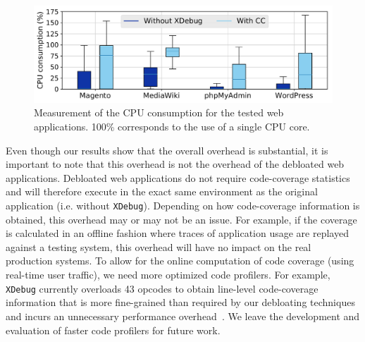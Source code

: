 \begin{figure}[t]
  \includegraphics[width=\linewidth]{figures/cpu.pdf}
  \caption{Measurement of the CPU consumption for the tested web
  applications. 100\% corresponds to the use of a single CPU core.}
  \label{fig:cpu}
\end{figure}

Even though our results show that the overall overhead is substantial, it is
important to note that this overhead is not the overhead of the debloated
web applications. Debloated web applications do not require code-coverage
statistics and will therefore execute in the exact same environment as
the original application (i.e. without \texttt{XDebug}). Depending on how
code-coverage information is obtained, this overhead may or may not be an
issue. For example, if the coverage is calculated in an offline fashion
where traces of application usage are replayed against a testing system,
this overhead will have no impact on the real production systems. To allow
for the online computation of code coverage (using real-time user traffic),
we need more optimized code profilers. For example, \texttt{XDebug} currently
overloads 43 opcodes to obtain line-level code-coverage information that
is more fine-grained than required by our debloating techniques and incurs
an unnecessary performance overhead~\cite{xdebug-performance2}. We leave
the development and evaluation of faster code profilers for future work.
